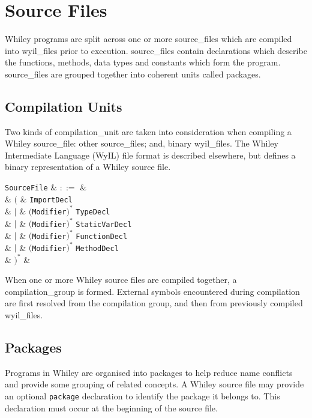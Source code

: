 \chapter{Source Files}
\label{c_source_files}
Whiley programs are split across one or more \gls{source_file}s which are compiled into \gls{wyil_file}s prior to execution. \Gls{source_file}s contain declarations which describe the functions, methods, data types and constants which form the program. \Gls{source_file}s are grouped together into coherent units called \gls{package}s.


\section{Compilation Units}
\label{c_source_files_compilation_units}
Two kinds of \gls{compilation_unit} are taken into consideration when compiling a Whiley \gls{source_file}: other \gls{source_file}s; and, binary \gls{wyil_file}s.  The Whiley Intermediate Language (WyIL) file format is described elsewhere, but defines a binary representation of a Whiley source file.  

\begin{syntax}
\verb+SourceFile+ & $::=$ &  \\
&  $\big($ & \verb+ImportDecl+\\
& $|$ & $($\verb+Modifier+$)^*$ \verb+TypeDecl+\\
& $|$ & $($\verb+Modifier+$)^*$ \verb+StaticVarDecl+\\
& $|$ & $($\verb+Modifier+$)^*$ \verb+FunctionDecl+\\
& $|$ & $($\verb+Modifier+$)^*$ \verb+MethodDecl+ \\
& $\big)^*$ &\\
\end{syntax}

When one or more Whiley source files are compiled together, a \gls{compilation_group} is formed.  External symbols encountered during compilation are first resolved from the compilation group, and then from previously compiled \gls{wyil_file}s.

\section{Packages}
\label{c_source_files_packages}

Programs in Whiley are organised into \gls{package}s to help reduce name conflicts and provide some grouping of related concepts.  A Whiley source file may provide an optional \lstinline{package} declaration to identify the package it belongs to.  This declaration must occur at the beginning of the source file.

